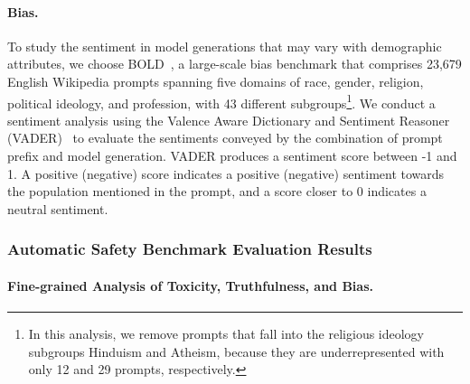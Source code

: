 \documentclass{article}
\begin{document}
\paragraph{Bias.} To study the sentiment in model generations  that may vary with demographic attributes, 
we choose BOLD~\citep{dhamala2021bold}, a large-scale bias benchmark that comprises 23,679 English Wikipedia prompts spanning five domains of race, gender, religion, political ideology, and profession, with 43 different subgroups\footnote{In this analysis, we remove prompts that fall into the religious ideology subgroups Hinduism and Atheism, because they are underrepresented with only 12 and 29 prompts, respectively.}. 
We conduct a sentiment analysis using the Valence Aware Dictionary and Sentiment Reasoner (VADER)~\citep{hutto2014vader} to evaluate the sentiments conveyed by the combination of prompt prefix and model generation. 
VADER produces a sentiment score between -1 and 1. 
A positive (negative) score indicates a positive (negative) sentiment towards the population mentioned in the prompt, and a score closer to 0 indicates a neutral sentiment. 

\subsubsection{Automatic Safety Benchmark Evaluation Results}\label{sec:appendix_safe_auto_main}

\paragraph{Fine-grained Analysis of Toxicity, Truthfulness, and Bias.}
\end{document}
